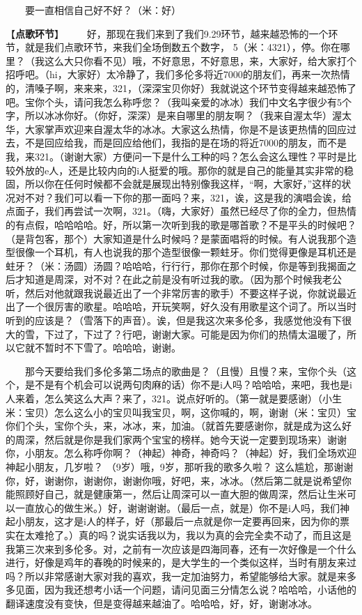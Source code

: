 \documentclass[]{ctexbook}
\begin{document}
  要一直相信自己好不好？（米：好）

【\textbf{点歌环节}】
  好，那现在我们来到了我们9.29环节，越来越恐怖的一个环节，就是我们点歌环节，来我们全场倒数五个数字， 5（米：4321），停。你在哪里？（我这么大只你看不见）哦，不好意思，不好意思，来，大家好，给大家打个招呼吧。（hi，大家好）太冷静了，我们多伦多将近7000的朋友们，再来一次热情的，清嗓子啊，来来来，321，（深深宝贝你好）我就说这个环节变得越来越恐怖了吧。宝你个头，请问我怎么称呼您？（我叫亲爱的冰冰）我们中文名字很少有5个字，所以冰冰你好。（你好，深深）是来自哪里的朋友啊？（我来自渥太华）渥太华，大家掌声欢迎来自渥太华的冰冰。大家这么热情，你是不是该更热情的回应过去，不是回应给我，而是回应给他们，我指的是在场的将近7000的朋友，而不是我，来321。（谢谢大家）方便问一下是什么工种的吗？怎么会这么理性？平时是比较外放的e人，还是比较内向的i人挺爱的哦。那你的就是自己的能量其实非常的稳固，所以你在任何时候都不会就是展现出特别像我这样，``啊，大家好，''这样的状况对不对？我们可以看一下你的那一面吗？来，321，诶，这是我的演唱会诶，给点面子，我们再尝试一次啊，321。（嗨，大家好）虽然已经尽了你的全力，但热情的有点假，哈哈哈哈。好，所以第一次听到我的歌是哪首歌？不是平头的时候吧？（是背包客，那个）大家知道是什么时候吗？是蒙面唱将的时候。有人说我那个造型很像一个耳机，有人也说我的那个造型很像一颗蛀牙。你们觉得更像是耳机还是蛀牙？（米：汤圆）汤圆？哈哈哈，行行行，那你在那个时候，你是等到我揭面之后才知道是周深，对不对？在此之前是没有听过我的歌。（因为那个时候我老公听，然后对他就跟我说最近出了一个非常厉害的歌手）不要这样子说，你就说最近出了一个很厉害的歌星。哈哈哈，开玩笑啊，好久没有用歌星这个词了。所以当时听到的应该是？（雪落下的声音）。诶，但是我这次来多伦多，我感觉他没有下很大的雪，下过了，下过了？行吧，谢谢大家。可能是因为你们的热情太温暖了，所以它就不暂时不下雪了。哈哈哈，谢谢。

  那今天要给我们多伦多第二场点的歌曲是？（且慢）且慢？来，宝你个头（这个，是不是有个机会可以说两句肉麻的话）你不是i人吗？哈哈哈，来吧，我也是i人来着，怎么笑这么大声？来了，321。说点好听的。（第一就是要感谢）（小生米：宝贝）怎么这么小的宝贝叫我宝贝，啊，这你喊的，啊，谢谢（米：宝贝）宝你们个头，宝你个头，来，冰冰，来，加油。（就首先要感谢你，就是成为这么好的周深，然后就是你是我们家两个宝宝的榜样。她今天说一定要到现场来）谢谢你，小朋友。怎么称呼你啊？（神起）神奇，神奇吗？（神起）好，我们全场欢迎神起小朋友，几岁啦？ （9岁）哦，9岁，那听我的歌多久啦？ 这么尴尬，那谢谢你，好，谢谢你，谢谢你，谢谢你哦，好吧，来，冰冰。（然后第二就是说希望你能照顾好自己，就是健康第一，然后让周深可以一直大胆的做周深，然后让生米可以一直放心的做生米。）好，谢谢谢谢。（最后一点，就是）你不是i人吗，我们神起小朋友，这才是i人的样子，好（那最后一点就是你一定要再回来，因为你的票实在太难抢了。）真的吗？说实话我以为，我以为真的会完全卖不动了，而且这是我第三次来到多伦多。对，之前有一次应该是四海同春，还有一次好像是一个什么进行，好像是鸡年的春晚的时候来的，是大学生的一个类似这样，当时有朋友来过吗？所以非常感谢大家对我的喜欢，我一定加油努力，希望能够给大家。就是来多多见面，因为我还想考小话一个问题，请问见面三分情怎么说？哈哈哈，小话他的翻译速度没有变快，但是变得越来越油了。哈哈哈，好，好，谢谢冰冰。
\end{document}
